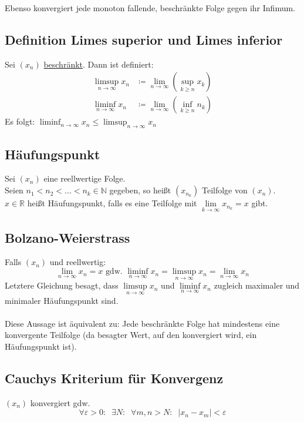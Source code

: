 \documentclass[halfparscip]{scrartcl}
\newcounter{subsection2}
\begin{document}
\noindent Ebenso konvergiert jede monoton fallende, beschränkte Folge gegen ihr Infimum.

\subsection*{Definition Limes superior und Limes inferior}
Sei $(x_n)$ \underline{beschränkt}.
Dann ist definiert:
\begin{align*}
	\limsup_{n \rightarrow \infty} x_n &\coloneqq \lim_{n \rightarrow \infty} (\sup_{k \geq n} x_k) \\
	\liminf_{n \rightarrow \infty} x_n &\coloneqq \lim_{n \rightarrow \infty} (\inf_{k \geq n} n_k)
\end{align*}
Es folgt: $\displaystyle\liminf_{n \rightarrow \infty} x_n  \leq \limsup_{n \rightarrow \infty} x_n$

\subsection{Häufungspunkt}
Sei $(x_n)$ eine reellwertige Folge. \\
Seien $n_1 < n_2 < ... < n_k \in \mathbb{N}$ gegeben, so heißt $(x_{n_k})$ Teilfolge von $(x_n)$.\\
$x \in \mathbb{R}$ heißt Häufungspunkt, falls es eine Teilfolge mit $\lim\limits_{k \rightarrow \infty} x_{n_k} = x$ gibt.

\subsection{Bolzano-Weierstrass}
Falls $(x_n)$ und reellwertig:
\begin{equation*}
	\lim_{n \rightarrow \infty} x_n = x \text{ gdw. } \liminf_{n \rightarrow \infty} x_n = \limsup_{n \rightarrow \infty} x_n = \lim_{n \rightarrow \infty} x_n
\end{equation*}
Letztere Gleichung besagt, dass $\limsup\limits_{n \rightarrow \infty} x_n$ und $\liminf\limits_{n \rightarrow \infty} x_n$ zugleich maximaler und minimaler Häufungspunkt sind.\\\\
Diese Aussage ist äquivalent zu: Jede beschränkte Folge hat mindestens eine konvergente Teilfolge (da besagter Wert, auf den konvergiert wird, ein Häufungspunkt ist).

\subsection{Cauchys Kriterium für Konvergenz}
$(x_n)$ konvergiert gdw. 
\begin{equation*}
	\forall \varepsilon > 0:\;\; \exists N : \;\; \forall m,n > N: \;\; \vert x_n - x_m\vert < \varepsilon
\end{equation*}
\end{document}

